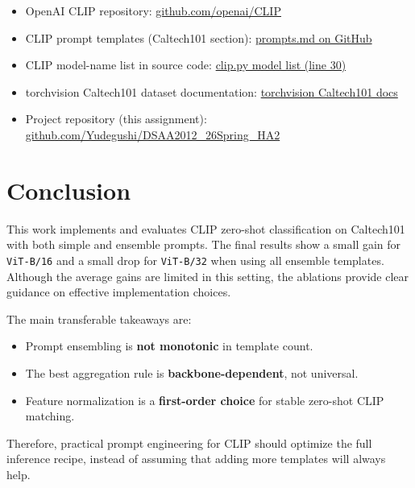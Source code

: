 \documentclass[11pt]{article}
\begin{document}
\begin{itemize}
  \item OpenAI CLIP repository:
  \href{https://github.com/openai/CLIP}{github.com/openai/CLIP}
  \item CLIP prompt templates (Caltech101 section):
  \href{https://github.com/openai/CLIP/blob/main/data/prompts.md}{prompts.md on GitHub}
  \item CLIP model-name list in source code:
  \href{https://github.com/openai/CLIP/blob/dcba3cb2e2827b402d2701e7e1c7d9fed8a20ef1/clip/clip.py#L30}{clip.py model list (line 30)}
  \item torchvision Caltech101 dataset documentation:
  \href{https://pytorch.org/vision/stable/generated/torchvision.datasets.Caltech101.html}{torchvision Caltech101 docs}
  \item Project repository (this assignment):
  \href{https://github.com/Yudegushi/DSAA2012_26Spring_HA2}{github.com/Yudegushi/DSAA2012\_26Spring\_HA2}
\end{itemize}

\section{Conclusion}

This work implements and evaluates CLIP zero-shot classification on Caltech101 with both simple and ensemble prompts.
The final results show a small gain for \texttt{ViT-B/16} and a small drop for \texttt{ViT-B/32} when using all ensemble templates.
Although the average gains are limited in this setting, the ablations provide clear guidance on effective implementation choices.

The main transferable takeaways are:
\begin{itemize}
  \item Prompt ensembling is \textbf{not monotonic} in template count.
  \item The best aggregation rule is \textbf{backbone-dependent}, not universal.
  \item Feature normalization is a \textbf{first-order choice} for stable zero-shot CLIP matching.
\end{itemize}

Therefore, practical prompt engineering for CLIP should optimize the full inference recipe,
instead of assuming that adding more templates will always help.
\end{document}
